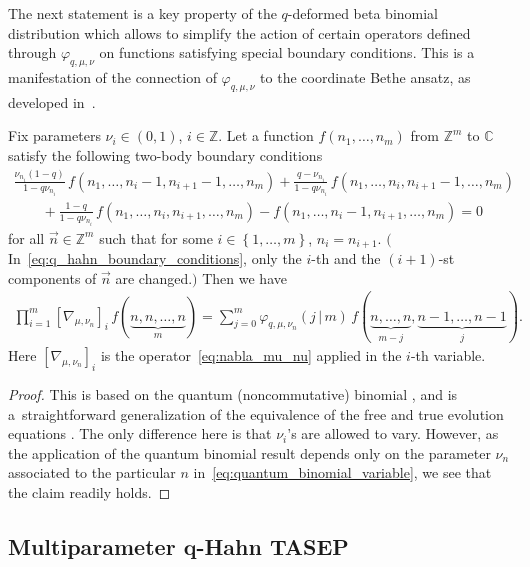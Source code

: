 The next statement is a key property of the $q$-deformed beta binomial distribution
which allows to simplify the action of certain operators defined through $\varphi_{q,\mu,\nu}$
on functions satisfying special boundary conditions. This is a manifestation of the
connection of $\varphi_{q,\mu,\nu}$ to the coordinate Bethe ansatz, as
developed in~\cite{Povolotsky2013}.
\begin{Lemma}
	\label{lemma:phi_duality}
	Fix parameters $\nu_i\in(0,1)$, $i\in \mathbb{Z}$.
	Let a function $f(n_1,\ldots,n_m )$ from
	$\mathbb{Z}^{m}$ to $\mathbb{C}$ satisfy the following
	two-body
	boundary conditions
\begin{gather}
\frac{\nu_{n_i}(1-q)}{1-q\nu_{n_i}}\,f(n_1,\ldots,n_{i}-1,n_{i+1}-1,\ldots ,n_m)
+\frac{q-\nu_{n_i}}{1-q\nu_{n_i}}\,f(n_1,\ldots,n_i,n_{i+1}-1,\ldots ,n_m)\nonumber
\\ \qquad
{}	+\frac{1-q}{1-q\nu_{n_i}}\,f(n_1,\ldots,n_i,n_{i+1},\ldots ,n_m)
-f(n_1,\ldots,n_i-1,n_{i+1},\ldots ,n_m)=0
		\label{eq:q_hahn_boundary_conditions}
		\end{gather}
	for all $\vec n\in \mathbb{Z}^m$
	such that for some $i \in \left\{ 1,\ldots,m \right\}$,
	$n_i=n_{i+1}$. $($In~\eqref{eq:q_hahn_boundary_conditions},
	only the $i$-th and the $(i+1)$-st components of $\vec n$
	are changed.$)$ Then we have
	\begin{gather}
		\label{eq:quantum_binomial_variable}
		\prod_{i=1}^{m}[\nabla_{\mu,\nu_{n}}]_i \,
		f(\underbrace{n,n,\ldots,n}_m)
		=
		\sum_{j=0}^{m}
		\varphi_{q,\mu,\nu_{n}}(j\,|\, m)\,
		f(\underbrace{n,\ldots,n }_{m-j},\underbrace{n-1,\ldots,n-1 }_{j}).
	\end{gather}
	Here $[\nabla_{\mu,\nu_{n}}]_i$ is the operator~\eqref{eq:nabla_mu_nu}
	applied in the $i$-th variable.
\end{Lemma}
\begin{proof}
	This is based on the quantum (noncommutative) binomial
	\cite[Theorem 1]{Povolotsky2013}, and is a~straightforward generalization of the
	equivalence of the free and true evolution equations
	\cite[Proposition 1.8]{Corwin2014qmunu}.
	The only difference here is that $\nu_i$'s are allowed to vary.
	However, as the application of the quantum binomial
	result depends only on the parameter $\nu_n$ associated
	to the particular $n$ in~\eqref{eq:quantum_binomial_variable},
	we see that the claim readily holds.
\end{proof}


\subsection[Multiparameter q-Hahn TASEP]
{Multiparameter $\boldsymbol q$-Hahn TASEP}\label{sub:qhahn_defn}

